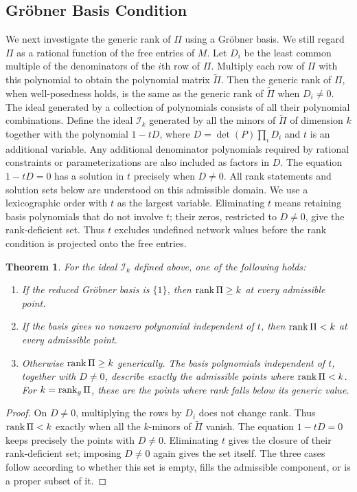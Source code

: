 \documentclass[journal,twoside,web]{ieeecolor}
\newtheorem{theorem}{Theorem}
\begin{document}
\subsection{Gröbner Basis Condition}
%
We next investigate the generic rank of $\Pi$ using a Gröbner basis.
We still regard $\Pi$ as a rational function of the free entries of
$M$. Let $D_i$ be the least common multiple
of the denominators of the $i$th row of $\Pi$. Multiply
each row of $\Pi$ with this polynomial to obtain the polynomial
matrix $\tilde{\Pi}$. Then the generic rank of $\Pi$, when 
well-posedness holds, is the same as the generic rank of 
$\tilde{\Pi}$ when $D_i\neq 0$. The ideal generated by a collection of
polynomials consists of all their polynomial combinations. Define the
ideal $\mathcal I_k$ generated by all the minors of $\tilde{\Pi}$ of 
dimension $k$ together with the polynomial $1-tD$, where 
$D=\det(P)\prod_i D_i$ and $t$ is an additional variable.
Any additional denominator polynomials required by rational constraints or
parameterizations are also included as factors in $D$.
The equation $1-tD=0$ has a solution in $t$ precisely when $D\neq 0$.
All rank statements and solution sets below are understood on this
admissible domain. We use a lexicographic order with $t$ as the largest
variable. Eliminating $t$ means retaining basis polynomials that do not
involve $t$; their zeros, restricted to $D\neq 0$, give the rank-deficient set.
Thus $t$ excludes undefined network values before the rank condition is
projected onto the free entries.
%
\begin{theorem}
%
For the ideal $\mathcal I_k$ defined above, one of the following holds:
%
\begin{enumerate}
    \item If the reduced Gröbner basis is $\{1\}$, then $\operatorname{rank}\Pi\geq k$
    at every admissible point.
    \item If the basis gives no nonzero polynomial independent of $t$,
    then $\operatorname{rank}\Pi<k$ at every admissible point.
    \item Otherwise $\operatorname{rank}\Pi\geq k$ generically. The basis polynomials
    independent of $t$, together with $D\neq 0$, describe exactly the
    admissible points where $\operatorname{rank}\Pi<k$. For $k=\operatorname{rank}_g\Pi$, these
    are the points where rank falls below its generic value.
\end{enumerate}
%
\end{theorem}
%
\begin{proof}
On $D\neq 0$, multiplying the rows by $D_i$ does not change rank. Thus
$\operatorname{rank}\Pi<k$ exactly when all the $k$-minors of $\tilde\Pi$ vanish.
The equation $1-tD=0$ keeps precisely the points with $D\neq 0$.
Eliminating $t$ gives the closure of their rank-deficient set; imposing
$D\neq 0$ again gives the set itself. The three cases follow according
to whether this set is empty, fills the admissible component, or is a
proper subset of it.
\end{proof}
\end{document}

